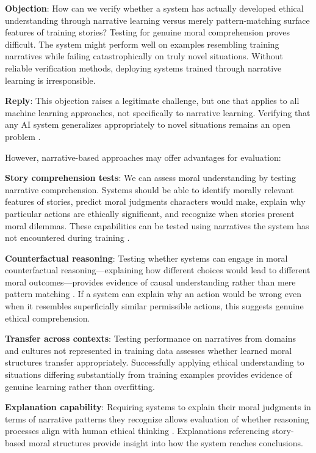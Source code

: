 \documentclass[12pt]{article}
\begin{document}
\textbf{Objection}: How can we verify whether a system has actually developed ethical understanding through narrative learning versus merely pattern-matching surface features of training stories? Testing for genuine moral comprehension proves difficult. The system might perform well on examples resembling training narratives while failing catastrophically on truly novel situations. Without reliable verification methods, deploying systems trained through narrative learning is irresponsible.

\textbf{Reply}: This objection raises a legitimate challenge, but one that applies to all machine learning approaches, not specifically to narrative learning. Verifying that any AI system generalizes appropriately to novel situations remains an open problem \citep{hendrycks2021unsolved}.

However, narrative-based approaches may offer advantages for evaluation:

\textbf{Story comprehension tests}: We can assess moral understanding by testing narrative comprehension. Systems should be able to identify morally relevant features of stories, predict moral judgments characters would make, explain why particular actions are ethically significant, and recognize when stories present moral dilemmas. These capabilities can be tested using narratives the system has not encountered during training \citep{forbes2020social, sap2019socialiqa}.

\textbf{Counterfactual reasoning}: Testing whether systems can engage in moral counterfactual reasoning—explaining how different choices would lead to different moral outcomes—provides evidence of causal understanding rather than mere pattern matching \citep{pearl2009causality}. If a system can explain why an action would be wrong even when it resembles superficially similar permissible actions, this suggests genuine ethical comprehension.

\textbf{Transfer across contexts}: Testing performance on narratives from domains and cultures not represented in training data assesses whether learned moral structures transfer appropriately. Successfully applying ethical understanding to situations differing substantially from training examples provides evidence of genuine learning rather than overfitting.

\textbf{Explanation capability}: Requiring systems to explain their moral judgments in terms of narrative patterns they recognize allows evaluation of whether reasoning processes align with human ethical thinking \citep{mittelstadt2019explaining}. Explanations referencing story-based moral structures provide insight into how the system reaches conclusions.
\end{document}

